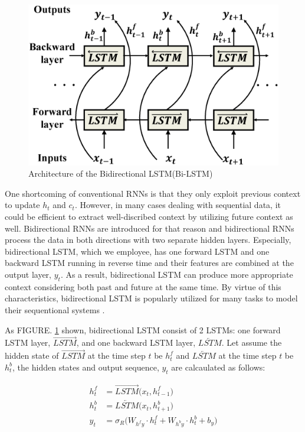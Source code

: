 \documentclass{ieeeaccess}
\begin{document}
\begin{figure}[h!]
	\centering
	\includegraphics[width=.9\linewidth]{bidirectional_LSTM_revised}
	\caption{Architecture of the Bidirectional LSTM(Bi-LSTM)}
	\label{fig:bidirectional_revised}	
\end{figure}


One shortcoming of conventional RNNs is that they only exploit previous context to update $h_{t}$ and $c_{t}$. However, in many cases dealing with sequential data, it could be efficient to extract well-discribed context by utilizing future context as well. Bidirectional RNNs are introduced\cite{schuster1997bidirectional} for that reason and bidirectional RNNs process the data in both directions with two separate hidden layers. Especially, bidirectional LSTM, which we employee, has one forward LSTM and one backward LSTM running in reverse time and their features are combined at the output layer, $y_{t}$. As a result, bidirectional LSTM can produce more appropriate context considering both past and future at the same time. By virtue of this characteristics, bidirectional LSTM is popularly utilized for many tasks to model their sequentional systems \cite{zhang2017multi,li2018human,ullah2018action}. 


As FIGURE. \ref{fig:bidirectional_revised} shown, bidirectional LSTM consist of 2 LSTMs: one forward LSTM layer, $\overrightarrow{LSTM}$, and one backward LSTM layer, $\overleftarrow{LSTM}$. Let assume the hidden state of $\overrightarrow{LSTM}$ at the time step $t$  be $h^{f}_{t}$ and $\overleftarrow{LSTM}$ at the time step $t$  be $h^{b}_{t}$, the hidden states and output sequence, $y_{t}$ are calcaulated as follows:

\begin{align}
h^{f}_{t} & =\overrightarrow{LSTM}\big(x_{t}, h^{f}_{t-1}\big)\\
h^{b}_{t} & =\overleftarrow{LSTM}\big(x_{t}, h^{b}_{t+1}\big)\\
y_{t} & =\sigma _{R}\big(W_{h^{f}y}\cdot h^{f}_{t}+W_{h^{b}y}\cdot h^{b}_{t}+b_{y}\big)
\end{align}
\end{document}
